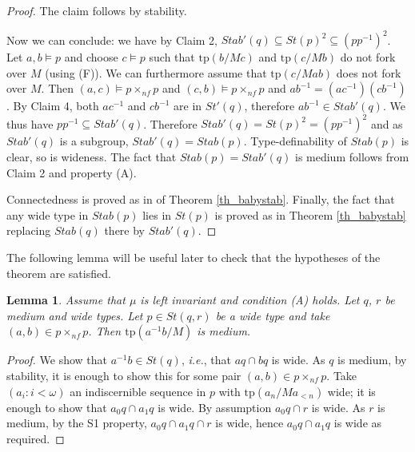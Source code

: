 \documentclass[12pt]{article}
\newtheorem{lemme}[thm]{Lemma}
\theoremstyle{definition}
\theoremstyle{mystyle}
\theoremstyle{remark}
\newcommand{\tp}{\mathrm{tp}}
\newcommand{\nf}{\times_{nf}}
\begin{document}
\begin{proof}
The claim follows by stability.

\medskip
Now we can conclude: we have by Claim 2, $Stab'(q)\subseteq
St(p)^2 \subseteq (pp^{-1})^2$. Let $a,b \models p$ and choose
$c\models p$ such that $\tp(b/Mc)$ and $\tp(c/Mb)$ do not fork
over $M$ (using (F)). We can furthermore assume that $\tp(c/Mab)$
does not fork over $M$. Then $(a,c)\models p\nf p$ and
$(c,b)\models p\nf p$ and $ab^{-1} = (ac^{-1})(cb^{-1})$. By Claim
4, both $ac^{-1}$ and $cb^{-1}$ are in $St'(q)$, therefore
$ab^{-1} \in Stab'(q)$. We thus have $pp^{-1}\subseteq Stab'(q)$.
Therefore $Stab'(q)=St(p)^2=(pp^{-1})^2$ and as $Stab'(q)$ is a
subgroup, $Stab'(q)=Stab(p)$. Type-definability of $Stab(p)$ is
clear, so is wideness. The fact that $Stab(p)=Stab'(q)$ is medium
follows from Claim 2 and property (A).

Connectedness is proved as in of Theorem \ref{th_babystab}.
Finally, the fact that any wide type in $Stab(p)$ lies in $St(p)$
is proved as in Theorem \ref{th_babystab} replacing $Stab(q)$
there by $Stab'(q)$.
%
\end{proof}


The following lemma will be useful later to check that the
hypotheses of the theorem are satisfied.

\begin{lemme}\label{lem_stqr}
Assume that $\mu$ is left invariant and condition (A) holds. Let $q$, $r$ be medium and wide types. Let $p\in St(q,r)$ be a wide type and take $(a,b)\in p \nf p$. Then $\tp(a^{-1}b/M)$ is medium.
\end{lemme}
\begin{proof}
We show that $a^{-1}b\in St(q)$, {\it i.e.}, that $aq \cap bq$ is
wide. As $q$ is medium, by stability, it is enough to show this
for some pair $(a,b)\in p\nf p$. Take $(a_i:i<\omega)$ an
indiscernible sequence in $p$ with $\tp(a_n/Ma_{<n})$ wide; it is
enough to show that $a_0q \cap a_1q$ is wide. By assumption $a_0 q
\cap r$ is wide. As $r$ is medium, by the S1 property, $a_0q \cap
a_1q \cap r$ is wide, hence $a_0q \cap a_1 q$ is wide as required.
\end{proof}
\end{document}
